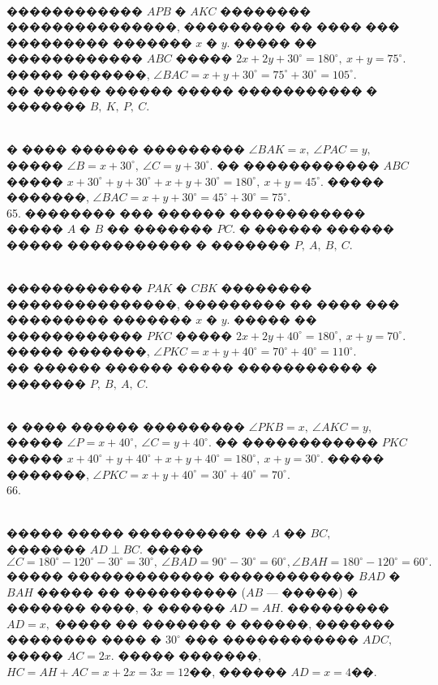 \documentclass[12pt]{article}
\begin{document}
\begin{figure}[ht!]
\end{figure}\\
������������ $APB$ � $AKC$ �������� ���������������, ��������� �� ���� ��� ��������� ������� $x$ � $y.$ ����� �� ������������ $ABC$ ����� $2x+2y+30^\circ=180^\circ,\ x+y=75^\circ.$ ����� �������, $\angle BAC=x+y+30^\circ=75^\circ+30^\circ=105^\circ.$\\
�� ������ ������ ����� ����������� � ������� $B,\ K,\ P,\ C.$
\begin{figure}[ht!]
\end{figure}\\
� ���� ������ ��������� $\angle BAK=x,\ \angle PAC=y,$ ����� $\angle B=x+30^\circ,\ \angle C=y+30^\circ.$ �� ������������ $ABC$ ����� $x+30^\circ+y+30^\circ+x+y+30^\circ=180^\circ,\ x+y=45^\circ.$ ����� �������, $\angle BAC=x+y+30^\circ=45^\circ+30^\circ=75^\circ.$\\
65. �������� ��� ������ ������������ ����� $A$ � $B$ �� ������� $PC.$ � ������ ������ ����� ����������� � ������� $P,\ A,\ B,\ C.$
\begin{figure}[ht!]
\end{figure}\\
������������ $PAK$ � $CBK$ �������� ���������������, ��������� �� ���� ��� ��������� ������� $x$ � $y.$ ����� �� ������������ $PKC$ ����� $2x+2y+40^\circ=180^\circ,\ x+y=70^\circ.$ ����� �������, $\angle PKC=x+y+40^\circ=70^\circ+40^\circ=110^\circ.$\\
�� ������ ������ ����� ����������� � ������� $P,\ B,\ A,\ C.$
\begin{figure}[ht!]
\end{figure}\\
� ���� ������ ��������� $\angle PKB=x,\ \angle AKC=y,$ ����� $\angle P=x+40^\circ,\ \angle C=y+40^\circ.$ �� ������������ $PKC$ ����� $x+40^\circ+y+40^\circ+x+y+40^\circ=180^\circ,\ x+y=30^\circ.$ ����� �������, $\angle PKC=x+y+40^\circ=30^\circ+40^\circ=70^\circ.$\\
66. \begin{figure}[ht!]
\end{figure}\\
����� ����� ���������� �� $A$ �� $BC,$ ������� $AD\perp BC.$ ����� $\angle C=180^\circ-120^\circ-30^\circ=30^\circ,\ \angle BAD=90^\circ-30^\circ=60^\circ, \angle BAH=180^\circ-120^\circ=60^\circ.$ ����� ������������� ������������ $BAD$ � $BAH$ ����� �� ���������� ($AB$ --- �����) � ������� ����, � ������ $AD=AH.$ ��������� $AD=x,$ ����� �� ������� � ������, ������� �������� ���� � $30^\circ$ ��� ������������ $ADC,$ ����� $AC=2x.$ ����� �������, $HC=AH+AC=x+2x=3x=12$��, ������ $AD=x=4$��.\\
\end{document}
